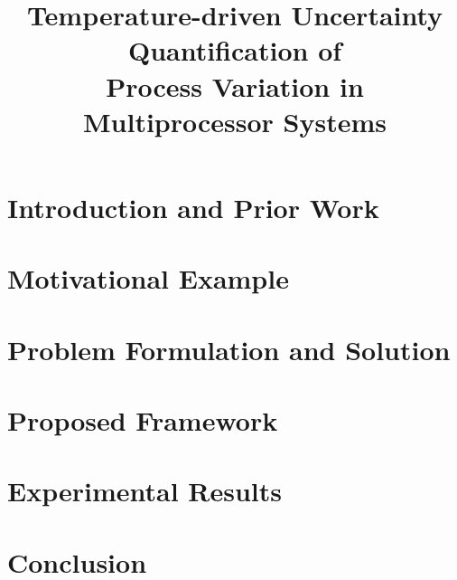 \documentclass[conference]{IEEEtran}
\begin{document}
  \title{Temperature-driven Uncertainty Quantification of\\Process Variation in Multiprocessor Systems}

  \author{}

  \maketitle

  \begin{abstract}
    
  \end{abstract}

  \section{Introduction and Prior Work} 
  

  \section{Motivational Example} 
  

  \section{Problem Formulation and Solution} 
  

  \section{Proposed Framework} 
  

  \section{Experimental Results} 
  

  \section{Conclusion} 
  

  \begingroup
  \setlength\bibitemsep{2pt}
  \printbibliography
  \endgroup

  \appendix
  
\end{document}
